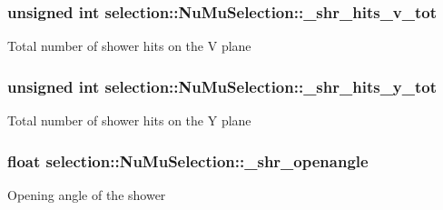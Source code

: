 \subsubsection[{\texorpdfstring{\+\_\+shr\+\_\+hits\+\_\+v\+\_\+tot}{_shr_hits_v_tot}}]{\setlength{\rightskip}{0pt plus 5cm}unsigned int selection\+::\+Nu\+Mu\+Selection\+::\+\_\+shr\+\_\+hits\+\_\+v\+\_\+tot\hspace{0.3cm}{\ttfamily [private]}}\hypertarget{classselection_1_1NuMuSelection_aa2d62d528b55bfbb0964fa68f2d0ff04}{}\label{classselection_1_1NuMuSelection_aa2d62d528b55bfbb0964fa68f2d0ff04}
Total number of shower hits on the V plane 
\subsubsection[{\texorpdfstring{\+\_\+shr\+\_\+hits\+\_\+y\+\_\+tot}{_shr_hits_y_tot}}]{\setlength{\rightskip}{0pt plus 5cm}unsigned int selection\+::\+Nu\+Mu\+Selection\+::\+\_\+shr\+\_\+hits\+\_\+y\+\_\+tot\hspace{0.3cm}{\ttfamily [private]}}\hypertarget{classselection_1_1NuMuSelection_a2d08099d9037a3bc8b3b5c7de3de4b4f}{}\label{classselection_1_1NuMuSelection_a2d08099d9037a3bc8b3b5c7de3de4b4f}
Total number of shower hits on the Y plane 
\subsubsection[{\texorpdfstring{\+\_\+shr\+\_\+openangle}{_shr_openangle}}]{\setlength{\rightskip}{0pt plus 5cm}float selection\+::\+Nu\+Mu\+Selection\+::\+\_\+shr\+\_\+openangle\hspace{0.3cm}{\ttfamily [private]}}\hypertarget{classselection_1_1NuMuSelection_ae0b0231c9373f62ab299817893c3d5f4}{}\label{classselection_1_1NuMuSelection_ae0b0231c9373f62ab299817893c3d5f4}
Opening angle of the shower 
